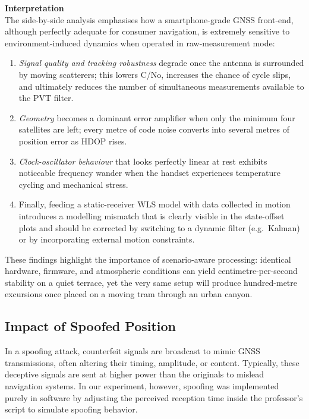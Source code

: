     \bigskip
    \noindent\textbf{Interpretation}\\
    The side-by-side analysis emphasises how a smartphone-grade GNSS front-end, although perfectly
    adequate for consumer navigation, is extremely sensitive to environment-induced dynamics when
    operated in raw-measurement mode:
    \begin{enumerate}
      \item \emph{Signal quality and tracking robustness} degrade once the antenna is surrounded by
            moving scatterers; this lowers C/No, increases the chance of cycle slips, and ultimately
            reduces the number of simultaneous measurements available to the PVT filter.
      \item \emph{Geometry} becomes a dominant error amplifier when only the minimum four satellites
            are left; every metre of code noise converts into several metres of position error as
            HDOP rises.
      \item \emph{Clock-oscillator behaviour} that looks perfectly linear at rest exhibits noticeable
            frequency wander when the handset experiences temperature cycling and mechanical stress.
      \item Finally, feeding a static-receiver WLS model with data collected in motion introduces a
            modelling mismatch that is clearly visible in the state-offset plots and should be
            corrected by switching to a dynamic filter (e.g.\ Kalman) or by incorporating external
            motion constraints.
    \end{enumerate}

    \medskip
    \noindent
    These findings highlight the importance of scenario-aware processing: identical hardware,
    firmware, and atmospheric conditions can yield centimetre-per-second stability on a quiet
    terrace, yet the very same setup will produce hundred-metre excursions once placed on a moving
    tram through an urban canyon.

    \subsection{Impact of Spoofed Position}

        In a spoofing attack, counterfeit signals are broadcast to mimic GNSS transmissions, often altering their timing, amplitude, or content. 
        Typically, these deceptive signals are sent at higher power than the originals to mislead navigation systems. 
        In our experiment, however, spoofing was implemented purely in software by adjusting the perceived reception time inside the professor’s script to simulate spoofing behavior.
            
